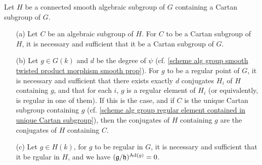 \begin{corollary}\label{scheme alg group smooth regular element of subgroup prop}
Let $H$ be a connected smooth algebraic subgroup of $G$ containing a Cartan subgroup of $G$.
\begin{enumerate}
    \item[(a)] Let $C$ be an algebraic subgroup of $H$. For $C$ to be a Cartan subgroup of $H$, it is necessary and sufficient that it be a Cartan subgroup of $G$.
    \item[(b)] Let $g\in G(k)$ and $d$ be the degree of $\psi$ (cf. \cref{scheme alg group smooth twisted product morphism smooth prop}). For $g$ to be a regular point of $G$, it is necessary and sufficient that there exists exactly $d$ conjugates $H_i$ of $H$ containing $g$, and that for each $i$, $g$ is a regular element of $H_i$ (or equivalently, is regular in one of them). If this is the case, and if $C$ is the unique Cartan subgroup containing $g$ (cf. \cref{scheme alg group regular element contained in unique Cartan subgroup}), then the conjugates of $H$ containing $g$ are the conjugates of $H$ containing $C$. 
    \item[(c)] Let $g\in H(k)$, for $g$ to be regular in $G$, it is necessary and sufficient that it be rgular in $H$, and we have $(\mathfrak{g}/\mathfrak{h})^{\mathrm{Ad}(g)}=0$. 
\end{enumerate}
\end{corollary}
